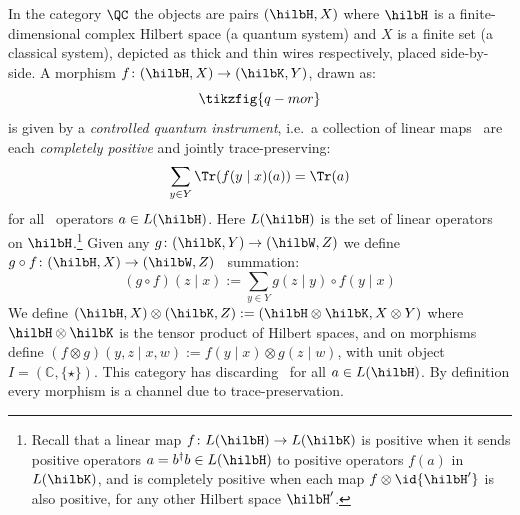 \documentclass{article}
\begin{document}
\begin{example}[\QC] \label{ex:QC-catgeory}
In the category $\QC$ the objects are pairs $(\hilbH, X)$ where $\hilbH$ is a finite-dimensional complex Hilbert space (a quantum system) and $X$ is a finite set (a classical system), depicted as thick and thin wires respectively, placed side-by-side. A morphism $f \colon (\hilbH, X) \to (\hilbK, Y)$, drawn as: 
\[
\tikzfig{q-mor}
\]
is given by a \emph{controlled quantum instrument}, i.e.~a collection of linear maps \ are each \emph{completely positive} and jointly trace-preserving:  
\[
\sum_{y \in Y} \Tr(f(y \mid x)(a)) = \Tr(a)
\]
for all \ operators $a \in L(\hilbH)$. Here $L(\hilbH)$ is the set of linear operators on $\hilbH$.\footnote{Recall that a linear map $f \colon L(\hilbH) \to L(\hilbK)$ is positive when it sends positive operators $a=b^\dagger b \in L(\hilbH)$ to positive operators $f(a)$ in $L(\hilbK)$, and is completely positive when each map $f \otimes \id{\hilbH'}$ is also positive, for any other Hilbert space $\hilbH'$.} Given any $g \colon (\hilbK, Y) \to (\hilbW, Z)$ we define $g \circ f \colon (\hilbH, X) \to (\hilbW, Z)$ \ summation: 
\[
(g \circ f)(z \mid x) := \sum_{y \in Y} g(z \mid y) \circ f(y \mid x)
\]
We define $(\hilbH, X) \otimes (\hilbK, Z) := (\hilbH \otimes \hilbK, X \otimes Y)$ where $\hilbH \otimes \hilbK$ is the tensor product of Hilbert spaces, and on morphisms define $(f \otimes g)(y, z \mid x, w) := f(y \mid x) \otimes g(z \mid w)$, with unit object $I=(\mathbb{C},\{\star\})$. This category has discarding \ for all $a \in L(\hilbH)$. By definition every morphism is a channel due to trace-preservation. 


\end{example}
\end{document}

